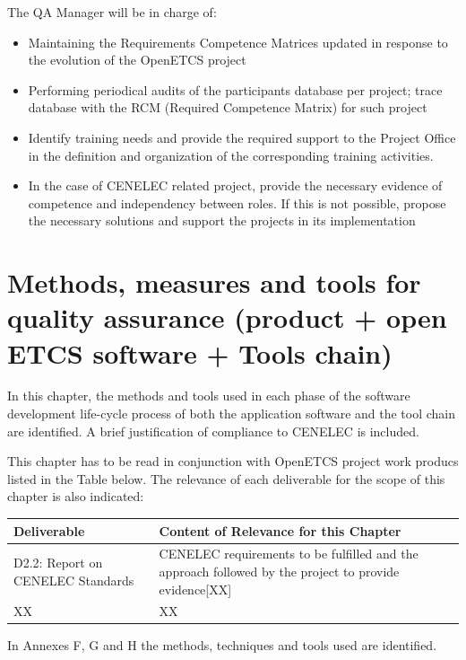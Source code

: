 \documentclass{template/openetcs_article}
\begin{document}
The QA Manager will be in charge of:
\begin{itemize}
\item Maintaining the Requirements Competence Matrices updated in response to the evolution of the OpenETCS project
\item Performing periodical audits of the participants{\textquotesingle} database per project; trace database with the RCM (Required Competence Matrix) for such project
\item Identify training needs and provide the required support to the Project Office in the definition and organization of the corresponding training activities.
\item In the case of CENELEC related project, provide the necessary evidence of competence and independency between roles. If this is not possible, propose the necessary solutions and support the projects in its implementation
\end{itemize}

\section{Methods, measures and tools for quality assurance (product + open ETCS software + Tools chain)}

In this chapter, the methods and tools used in each phase of the software development life-cycle process of both the application software and the tool chain are identified. A brief justification of compliance to CENELEC is included.

This chapter has to be read in conjunction with OpenETCS project work producs listed in the Table below. The relevance of each deliverable for the scope of this chapter is also indicated:

\begin{flushleft}
\tablefirsthead{}
\tablehead{}
\tabletail{}
\tablelasttail{}
\begin{supertabular}[H]{|m{3cm}|m{11cm}|}
\hline
{}
Deliverable &
Content of Relevance for this Chapter\\\hline
D2.2: Report on CENELEC Standards &
CENELEC requirements to be fulfilled and the approach followed by the project to provide evidence[XX]\\\hline
XX &
XX \\\hline
\end{supertabular}
\end{flushleft}

In Annexes F, G and H the methods, techniques and tools used are identified.
\end{document}
